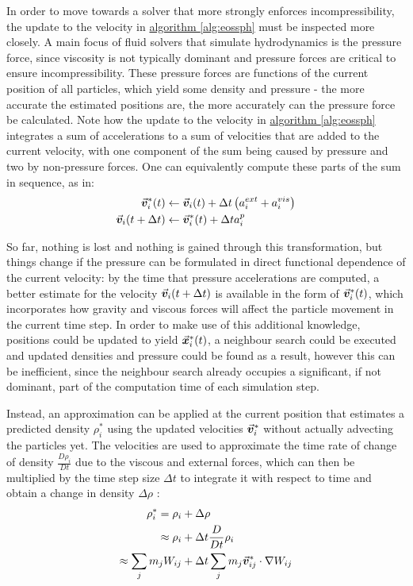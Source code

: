 In order to move towards a solver that more strongly enforces incompressibility, the update to the velocity in \hyperref[alg:eossph]{algorithm \ref{alg:eossph}} must be inspected more closely. A main focus of fluid solvers that simulate hydrodynamics is the pressure force, since viscosity is not typically dominant and pressure forces are critical to ensure incompressibility\autocite*{tutorial}. These pressure forces are functions of the current position of all particles, which yield some density and pressure - the more accurate the estimated positions are, the more accurately can the pressure force be calculated. Note how the update to the velocity in \hyperref[alg:eossph]{algorithm \ref{alg:eossph}} integrates a sum of accelerations to a sum of velocities that are added to the current velocity, with one component of the sum being caused by pressure and two by non-pressure forces. One can equivalently compute these parts of the sum in sequence, as in:
\begin{align}
  \vec{\bm{v}}_i^*(t)        & \gets \vec{\bm{v}}_i(t) + \Delta t \left(a_i^{ext} + a_i^{vis}\right) \\
  \vec{\bm{v}}_i(t+\Delta t) & \gets \vec{\bm{v}}_i^*(t) + \Delta t a_i^{p}
\end{align}

So far, nothing is lost and nothing is gained through this transformation, but things change if the pressure can be formulated in direct functional dependence of the current velocity: by the time that pressure accelerations are computed, a better estimate for the velocity $\vec{\bm{v}}_i(t+\Delta t)$ is available in the form of $\vec{\bm{v}}_i^*(t)$, which incorporates how gravity and viscous forces will affect the particle movement in the current time step. In order to make use of this additional knowledge, positions could be updated to yield $\vec{\bm{x}}_i^*(t)$, a neighbour search could be executed and updated densities and pressure could be found as a result, however this can be inefficient, since the neighbour search already occupies a significant, if not dominant, part of the computation time of each simulation step.

Instead, an approximation can be applied at the current position that estimates a predicted density $\rho_i^*$ using the updated velocities $\vec{\bm{v}}_i^*$ without actually advecting the particles yet. The velocities are used to approximate the time rate of change of density $\frac{D\rho_i}{Dt}$ due to the viscous and external forces, which can then be multiplied by the time step size $\Delta t$ to integrate it with respect to time and obtain a change in density $\Delta\rho$ \autocite*{teschner-lecture}:
\begin{align}\label{eq:predicted-density-from-v-star}
  \rho_i^*  = \rho_i        & +\Delta\rho                                            \\
  \approx \rho_i            & + \Delta t \frac{D}{Dt}\rho_i                          \\
  \approx \sum_j m_j W_{ij} & + \Delta t \sum_j m_j \vec{\bm{v}}^*_{ij}\cdot\nabla W_{ij}
\end{align}

